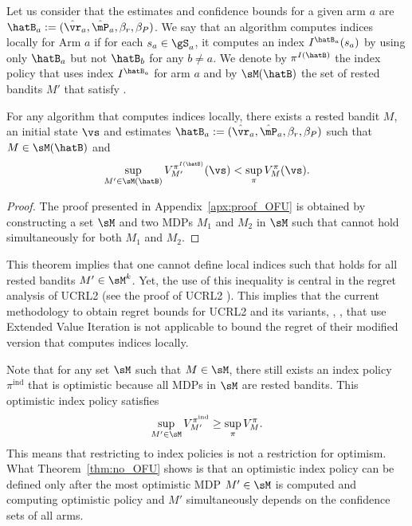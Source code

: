 Let us consider that the estimates and confidence bounds for a given arm $a$ are $\hatB_a:=(\hat{\vr}_a,\hat{\mP}_a,\beta_{r},\beta_{P})$. We say that an algorithm computes indices locally for Arm $a$ if for each $s_a\in\gS_a$, it computes an index $I^{\hatB_a}(s_a)$ by using only $\hatB_a$ but not $\hatB_{b}$ for any $b\ne a$. We denote by $\pi^{I(\hatB)}$ the index policy that uses index $I^{\hatB_a}$ for arm $a$ and by $\sM(\hatB)$ the set of rested bandits $M'$ that satisfy .
\begin{thm}
    \label{thm:no_OFU}
    For any algorithm that computes indices locally, there exists a rested bandit $M$, an initial state $\vs$ and estimates $\hatB_a:=(\hat{\vr}_a,\hat{\mP}_a, \beta_r, \beta_P)$ such that $M\in\sM(\hatB)$ and
    \begin{align*}
        \sup_{M'\in\sM(\hatB)}V^{\pi^{I(\hatB)}}_{M'}(\vs) < \sup_\pi V^{\pi}_{M}(\vs).
    \end{align*}
\end{thm}
\begin{proof}
    The proof presented in Appendix~\ref{apx:proof_OFU} is obtained by constructing a set $\sM$ and two MDPs $M_1$ and $M_2$ in $\sM$ such that  cannot hold simultaneously for both $M_1$ and $M_2$. 
\end{proof}
This theorem implies that one cannot define local indices such that  holds for all rested bandits $M'\in\sM^k$. Yet, the use of this inequality is central in the regret analysis of UCRL2 (see the proof of UCRL2 \cite{jaksch2010near}). This implies that the current methodology to obtain regret bounds for UCRL2 and its variants, \eg, \cite{bourel2020tightening,fruit2018efficient,talebi2018variance,filippi2010optimism}, that use Extended Value Iteration is not applicable to bound the regret of their modified version that computes indices locally. 

Note that for any set $\sM$ such that $M \in \sM$, there still exists an index policy $\pi^{\mathrm{ind}}$ that is optimistic because all MDPs in $\sM$ are rested bandits. This optimistic index policy satisfies
\begin{align*}
  \sup_{M'\in\sM}V^{\pi^{\mathrm{ind}}}_{M'} \ge \sup_\pi V^{\pi}_{M}.
\end{align*}
This means that restricting to index policies is not a restriction for optimism. What Theorem~\ref{thm:no_OFU} shows is that an optimistic index policy can be defined only after the most optimistic MDP $M'\in\sM$ is computed and computing optimistic policy and $M'$ simultaneously depends on the confidence sets of all arms.


